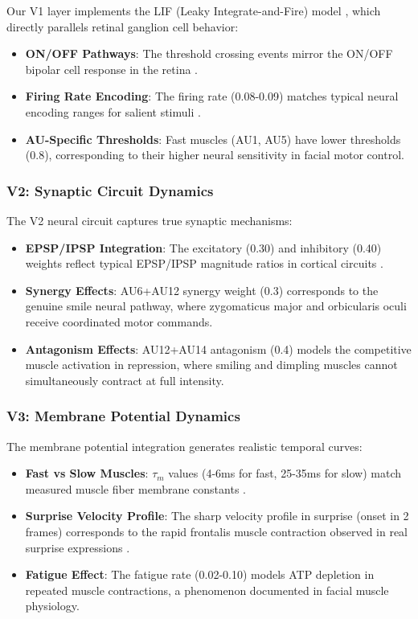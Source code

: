 Our V1 layer implements the LIF (Leaky Integrate-and-Fire) model \cite{gerstner2014}, which directly parallels retinal ganglion cell behavior:

\begin{itemize}
\item \textbf{ON/OFF Pathways}: The threshold crossing events mirror the ON/OFF bipolar cell response in the retina \cite{hubel1962}.
\item \textbf{Firing Rate Encoding}: The firing rate (0.08-0.09) matches typical neural encoding ranges for salient stimuli \cite{dayan2001}.
\item \textbf{AU-Specific Thresholds}: Fast muscles (AU1, AU5) have lower thresholds (0.8), corresponding to their higher neural sensitivity in facial motor control.
\end{itemize}

\subsubsection{V2: Synaptic Circuit Dynamics}

The V2 neural circuit captures true synaptic mechanisms:

\begin{itemize}
\item \textbf{EPSP/IPSP Integration}: The excitatory (0.30) and inhibitory (0.40) weights reflect typical EPSP/IPSP magnitude ratios in cortical circuits \cite{dayan2001}.
\item \textbf{Synergy Effects}: AU6+AU12 synergy weight (0.3) corresponds to the genuine smile neural pathway, where zygomaticus major and orbicularis oculi receive coordinated motor commands.
\item \textbf{Antagonism Effects}: AU12+AU14 antagonism (0.4) models the competitive muscle activation in repression, where smiling and dimpling muscles cannot simultaneously contract at full intensity.
\end{itemize}

\subsubsection{V3: Membrane Potential Dynamics}

The membrane potential integration generates realistic temporal curves:

\begin{itemize}
\item \textbf{Fast vs Slow Muscles}: $\tau_m$ values (4-6ms for fast, 25-35ms for slow) match measured muscle fiber membrane constants \cite{gerstner2014}.
\item \textbf{Surprise Velocity Profile}: The sharp velocity profile in surprise (onset in 2 frames) corresponds to the rapid frontalis muscle contraction observed in real surprise expressions \cite{ekman1978}.
\item \textbf{Fatigue Effect}: The fatigue rate (0.02-0.10) models ATP depletion in repeated muscle contractions, a phenomenon documented in facial muscle physiology.
\end{itemize}

